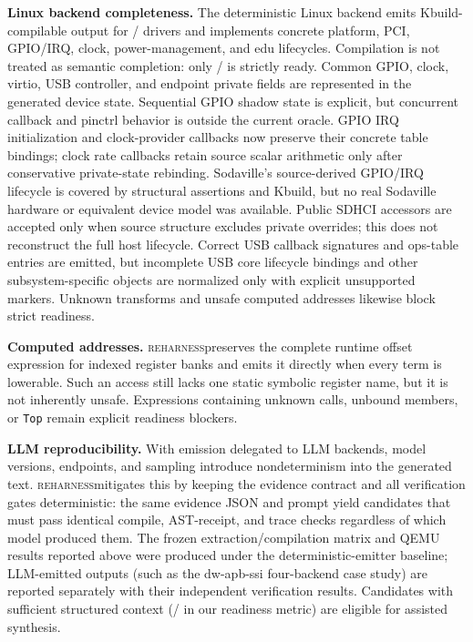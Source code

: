 \documentclass[sigplan, screen, review, anonymous]{acmart}
\newcommand{\reharness}{\textsc{reharness}}
\begin{document}
\textbf{Linux backend completeness.} The deterministic Linux backend emits Kbuild-compilable output for \LinuxCompileCount{}/\EvalDrivers{} drivers and implements concrete platform, PCI, GPIO/IRQ, clock, power-management, and edu lifecycles. Compilation is not treated as semantic completion: only \LinuxReadyCount{}/\EvalDrivers{} is strictly ready. Common GPIO, clock, virtio, USB controller, and endpoint private fields are represented in the generated device state. Sequential GPIO shadow state is explicit, but concurrent callback and pinctrl behavior is outside the current oracle. GPIO IRQ initialization and clock-provider callbacks now preserve their concrete table bindings; clock rate callbacks retain source scalar arithmetic only after conservative private-state rebinding. Sodaville's source-derived GPIO/IRQ lifecycle is covered by structural assertions and Kbuild, but no real Sodaville hardware or equivalent device model was available. Public SDHCI accessors are accepted only when source structure excludes private overrides; this does not reconstruct the full host lifecycle. Correct USB callback signatures and ops-table entries are emitted, but incomplete USB core lifecycle bindings and other subsystem-specific objects are normalized only with explicit unsupported markers. Unknown transforms and unsafe computed addresses likewise block strict readiness.

\textbf{Computed addresses.} \reharness preserves the complete runtime offset expression for indexed register banks and emits it directly when every term is lowerable. Such an access still lacks one static symbolic register name, but it is not inherently unsafe. Expressions containing unknown calls, unbound members, or \texttt{Top} remain explicit readiness blockers.

\textbf{LLM reproducibility.} With emission delegated to LLM backends, model versions, endpoints, and sampling introduce nondeterminism into the generated text. \reharness mitigates this by keeping the evidence contract and all verification gates deterministic: the same evidence JSON and prompt yield candidates that must pass identical compile, AST-receipt, and trace checks regardless of which model produced them. The frozen extraction/compilation matrix and QEMU results reported above were produced under the deterministic-emitter baseline; LLM-emitted outputs (such as the dw-apb-ssi four-backend case study) are reported separately with their independent verification results. Candidates with sufficient structured context (\LLMReadyCount{}/\EvalDrivers{} in our readiness metric) are eligible for assisted synthesis.
\end{document}
